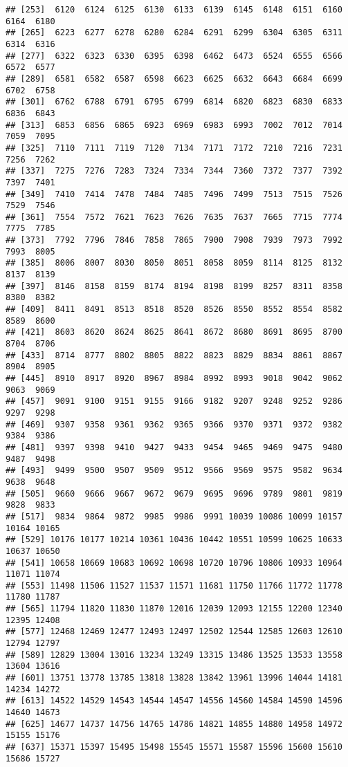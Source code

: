 \documentclass[
]{book}
\begin{document}
\begin{verbatim}
## [253]  6120  6124  6125  6130  6133  6139  6145  6148  6151  6160  6164  6180
## [265]  6223  6277  6278  6280  6284  6291  6299  6304  6305  6311  6314  6316
## [277]  6322  6323  6330  6395  6398  6462  6473  6524  6555  6566  6572  6577
## [289]  6581  6582  6587  6598  6623  6625  6632  6643  6684  6699  6702  6758
## [301]  6762  6788  6791  6795  6799  6814  6820  6823  6830  6833  6836  6843
## [313]  6853  6856  6865  6923  6969  6983  6993  7002  7012  7014  7059  7095
## [325]  7110  7111  7119  7120  7134  7171  7172  7210  7216  7231  7256  7262
## [337]  7275  7276  7283  7324  7334  7344  7360  7372  7377  7392  7397  7401
## [349]  7410  7414  7478  7484  7485  7496  7499  7513  7515  7526  7529  7546
## [361]  7554  7572  7621  7623  7626  7635  7637  7665  7715  7774  7775  7785
## [373]  7792  7796  7846  7858  7865  7900  7908  7939  7973  7992  7993  8005
## [385]  8006  8007  8030  8050  8051  8058  8059  8114  8125  8132  8137  8139
## [397]  8146  8158  8159  8174  8194  8198  8199  8257  8311  8358  8380  8382
## [409]  8411  8491  8513  8518  8520  8526  8550  8552  8554  8582  8589  8600
## [421]  8603  8620  8624  8625  8641  8672  8680  8691  8695  8700  8704  8706
## [433]  8714  8777  8802  8805  8822  8823  8829  8834  8861  8867  8904  8905
## [445]  8910  8917  8920  8967  8984  8992  8993  9018  9042  9062  9063  9069
## [457]  9091  9100  9151  9155  9166  9182  9207  9248  9252  9286  9297  9298
## [469]  9307  9358  9361  9362  9365  9366  9370  9371  9372  9382  9384  9386
## [481]  9397  9398  9410  9427  9433  9454  9465  9469  9475  9480  9487  9498
## [493]  9499  9500  9507  9509  9512  9566  9569  9575  9582  9634  9638  9648
## [505]  9660  9666  9667  9672  9679  9695  9696  9789  9801  9819  9828  9833
## [517]  9834  9864  9872  9985  9986  9991 10039 10086 10099 10157 10164 10165
## [529] 10176 10177 10214 10361 10436 10442 10551 10599 10625 10633 10637 10650
## [541] 10658 10669 10683 10692 10698 10720 10796 10806 10933 10964 11071 11074
## [553] 11498 11506 11527 11537 11571 11681 11750 11766 11772 11778 11780 11787
## [565] 11794 11820 11830 11870 12016 12039 12093 12155 12200 12340 12395 12408
## [577] 12468 12469 12477 12493 12497 12502 12544 12585 12603 12610 12794 12797
## [589] 12829 13004 13016 13234 13249 13315 13486 13525 13533 13558 13604 13616
## [601] 13751 13778 13785 13818 13828 13842 13961 13996 14044 14181 14234 14272
## [613] 14522 14529 14543 14544 14547 14556 14560 14584 14590 14596 14640 14673
## [625] 14677 14737 14756 14765 14786 14821 14855 14880 14958 14972 15155 15176
## [637] 15371 15397 15495 15498 15545 15571 15587 15596 15600 15610 15686 15727

\end{verbatim}
\end{document}
